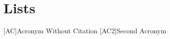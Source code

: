 \appendix
\renewcommand{\appendixtocname}{Appendix}
\renewcommand{\appendixpagename}{\appendixtocname}
\addappheadtotoc
{}
\appendixpage

\chapter{Lists}
{}
\begin{acronym}[\hspace{3cm}]
  [AC]{Acronym Without Citation}
  [AC2]{Second Acronym}
\end{acronym}
\clearpage
\listoffigures
{}
{}
